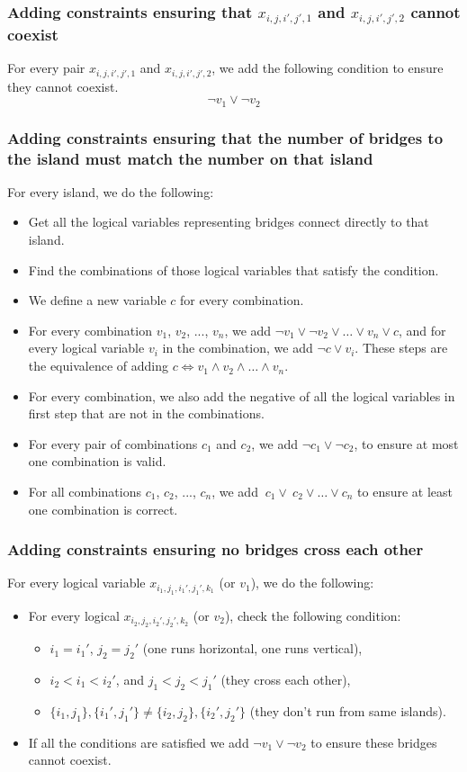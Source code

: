 \documentclass[12pt, a4paper]{article}
\begin{document}
\subsubsection{Adding constraints ensuring that $x_{i,j,i',j',1}$ and $x_{i,j,i',j',2}$ cannot coexist}
For every pair $x_{i,j,i',j',1}$ and $x_{i,j,i',j',2}$, we add the following condition to ensure they cannot coexist.
\[
\lnot v_1 \lor \lnot v_2
\]
\subsubsection{Adding constraints ensuring that the number of bridges to the island must match the number on that island}
For every island, we do the following:
\begin{itemize}
    \item Get all the logical variables representing bridges connect directly to that island.
    \item Find the combinations of those logical variables that satisfy the condition.
    \item We define a new variable $c$ for every combination.
    \item For every combination {$v_1$, $v_2$, ..., $v_n$}, we add \(\lnot v_1 \lor \lnot v_2 \lor \dots \lor v_n \lor c\), and for every logical variable $v_i$ in the combination, we add \(\lnot c \lor v_i\). These steps are the equivalence of adding \(c \iff v_1 \land v_2 \land \dots \land v_n\).
    \item For every combination, we also add the negative of all the logical variables in first step that are not in the combinations.
    \item For every pair of combinations $c_1$ and $c_2$, we add \(\lnot c_1 \lor \lnot c_2\), to ensure at most one combination is valid.
    \item For all combinations {$c_1$, $c_2$, ..., $c_n$}, we add \(\ c_1 \lor \ c_2 \lor \dots \lor c_n\) to ensure at least one combination is correct.
\end{itemize}
\subsubsection{Adding constraints ensuring no bridges cross each other}
For every logical variable $x_{i_1,j_1,i_1',j_1',k_1}$ (or $v_1$), we do the following:
\begin{itemize}
    \item For every logical $x_{i_2,j_2,i_2',j_2',k_2}$ (or $v_2$), check the following condition:
    \begin{itemize}
        \item $i_1 = i_1'$, $j_2 = j_2'$ (one runs horizontal, one runs vertical),
        \item $i_2 < i_1 < i_2'$, and $j_1 < j_2 < j_1'$ (they cross each other),
        \item $\{i_1,j_1\}, \{i_1',j_1'\} \ne \{i_2,j_2\}, \{i_2',j_2'\}$ (they don't run from same islands).
    \end{itemize}
    \item If all the conditions are satisfied we add \(\lnot v_1 \lor \lnot v_2\) to ensure these bridges cannot coexist.
\end{itemize}
\end{document}
